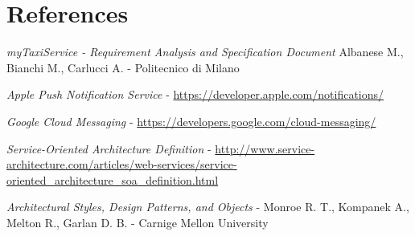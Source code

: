 \pagebreak
\section{References}
\begin{thebibliography}{9}

    \emph{myTaxiService - Requirement Analysis and Specification Document}
    Albanese M., Bianchi M., Carlucci A. - Politecnico di Milano

    \emph{Apple Push Notification Service} -
    \url{https://developer.apple.com/notifications/}

    \emph{Google Cloud Messaging} - 
    \url{https://developers.google.com/cloud-messaging/}

    \emph{Service-Oriented Architecture Definition} - 
    \url{http://www.service-architecture.com/articles/web-services/service-oriented_architecture_soa_definition.html}

    \emph{Architectural Styles, Design Patterns, and Objects} - 
    Monroe R. T., Kompanek A., Melton R., Garlan D. B. - 
    Carnige Mellon University

\end{thebibliography}
